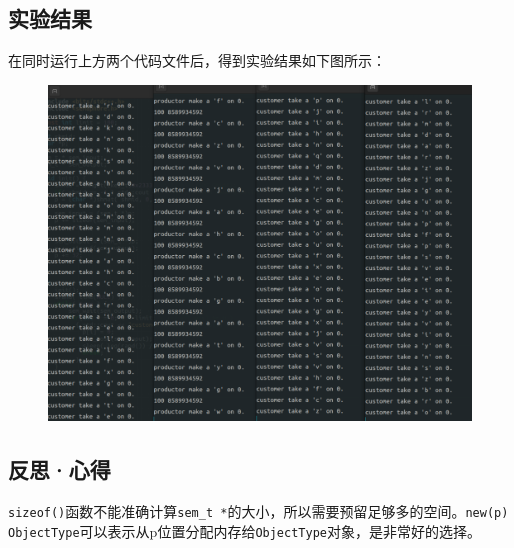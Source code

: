 \documentclass[UTF8]{ctexart}
\begin{document}
\subsection{实验结果}
在同时运行上方两个代码文件后，得到实验结果如下图所示：
\begin{figure}[htbp]
	\begin{center}
		\includegraphics[width=0.8\pdfpagewidth]{os6.png}
	\end{center}
\end{figure}
\subsection{反思·心得}
\texttt{sizeof()}函数不能准确计算\texttt{sem\_t *}的大小，所以需要预留足够多的空间。\texttt{new(p) ObjectType}可以表示从p位置分配内存给\texttt{ObjectType}对象，是非常好的选择。
\end{document}
